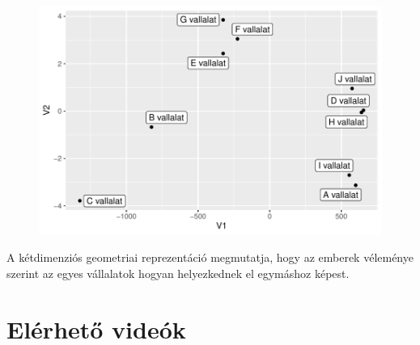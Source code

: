 \documentclass[
  letterpaper,
]{krantz}
\makeatletter
\newenvironment{Shaded}{\begin{snugshade}}{\end{snugshade}}
\newcommand{\AttributeTok}[1]{\textcolor[rgb]{0.40,0.45,0.13}{#1}}
\newcommand{\FunctionTok}[1]{\textcolor[rgb]{0.28,0.35,0.67}{#1}}
\newcommand{\NormalTok}[1]{\textcolor[rgb]{0.00,0.23,0.31}{#1}}
\newcommand{\SpecialCharTok}[1]{\textcolor[rgb]{0.37,0.37,0.37}{#1}}
\newenvironment{kframe}{%
\medskip{}
\setlength{\fboxsep}{.8em}
 \def\at@end@of@kframe{}%
 \ifinner\ifhmode%
  \def\at@end@of@kframe{\end{minipage}}%
  \begin{minipage}{\columnwidth}%
 \fi\fi%
 \def\FrameCommand##1{\hskip\@totalleftmargin \hskip-\fboxsep
 \colorbox{shadecolor}{##1}\hskip-\fboxsep
     \hskip-\linewidth \hskip-\@totalleftmargin \hskip\columnwidth}%
 \MakeFramed {\advance\hsize-\width
   \@totalleftmargin\z@ \linewidth\hsize
   \@setminipage}}%
 {\par\unskip\endMakeFramed%
 \at@end@of@kframe}
\renewenvironment{Shaded}{\begin{kframe}}{\end{kframe}}
\makeatother
\begin{document}
\begin{Shaded}
\end{Shaded}

\begin{figure}[H]

{\centering \includegraphics{./sec_tobbdimenzios_skalazas_files/figure-pdf/unnamed-chunk-42-1.pdf}

}

\end{figure}

A kétdimenziós geometriai reprezentáció megmutatja, hogy az emberek
véleménye szerint az egyes vállalatok hogyan helyezkednek el egymáshoz
képest.

\appendix
{}

\hypertarget{sec-elerheto-videok}{%
\chapter{Elérhető videók}\label{sec-elerheto-videok}}
\end{document}
